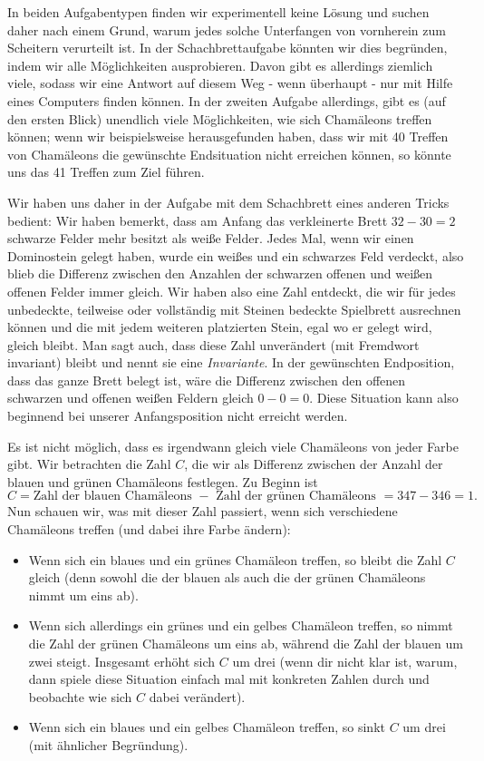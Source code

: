 \documentclass[a4paper,ngerman,12pt]{scrartcl}
\theoremstyle{definition}
\theoremstyle{plain}
\theoremstyle{remark}
\begin{document}
In beiden Aufgabentypen finden wir experimentell keine Lösung und suchen daher nach einem Grund, warum jedes solche Unterfangen von vornherein zum Scheitern verurteilt ist. In der Schachbrettaufgabe könnten wir dies begründen, indem wir alle Möglichkeiten ausprobieren. Davon gibt es allerdings ziemlich viele, sodass wir eine Antwort auf diesem Weg - wenn überhaupt - nur mit Hilfe eines Computers finden können. In der zweiten Aufgabe allerdings, gibt es (auf den ersten Blick) unendlich viele Möglichkeiten, wie sich Chamäleons treffen können; wenn wir beispielsweise herausgefunden haben, dass wir mit 40 Treffen von Chamäleons die gewünschte Endsituation nicht erreichen können, so könnte uns das 41 Treffen zum Ziel führen.

Wir haben uns daher in der Aufgabe mit dem Schachbrett eines anderen Tricks bedient: Wir haben bemerkt, dass am Anfang das verkleinerte Brett $32 - 30 = 2$ schwarze Felder mehr besitzt als weiße Felder. Jedes Mal, wenn wir einen Dominostein gelegt haben, wurde ein weißes und ein schwarzes Feld verdeckt, also blieb die Differenz zwischen den Anzahlen der schwarzen offenen und weißen offenen Felder immer gleich. Wir haben also eine Zahl entdeckt, die wir für jedes unbedeckte, teilweise oder vollständig mit Steinen bedeckte Spielbrett ausrechnen können und die mit jedem weiteren platzierten Stein, egal wo er gelegt wird, gleich bleibt. Man sagt auch, dass diese Zahl unverändert (mit Fremdwort invariant) bleibt und nennt sie eine \emph{Invariante}. In der gewünschten Endposition, dass das ganze Brett belegt ist, wäre die Differenz zwischen den offenen schwarzen und offenen weißen Feldern gleich $0 - 0 = 0$. Diese Situation kann also beginnend bei unserer Anfangsposition nicht erreicht werden.

Es ist nicht möglich, dass es irgendwann gleich viele Chamäleons von jeder Farbe gibt. Wir betrachten die Zahl $C$, die wir als Differenz zwischen der Anzahl der blauen und grünen Chamäleons festlegen. Zu Beginn ist
	\[C = \text{Zahl der blauen Chamäleons } - \text{ Zahl der grünen Chamäleons } = 347 - 346 = 1.\]
Nun schauen wir, was mit dieser Zahl passiert, wenn sich verschiedene Chamäleons treffen (und dabei ihre Farbe ändern):
\begin{itemize}
	\item Wenn sich ein blaues und ein grünes Chamäleon treffen, so bleibt die Zahl $C$ gleich (denn sowohl die der blauen als auch die der grünen Chamäleons nimmt um eins ab).
	\item Wenn sich allerdings ein grünes und ein gelbes Chamäleon treffen, so nimmt die Zahl der grünen Chamäleons um eins ab, während die Zahl der blauen um zwei steigt. Insgesamt erhöht sich $C$ um drei (wenn dir nicht klar ist, warum, dann spiele diese Situation einfach mal mit konkreten Zahlen durch und beobachte wie sich $C$ dabei verändert).
	\item Wenn sich ein blaues und ein gelbes Chamäleon treffen, so sinkt $C$ um drei (mit ähnlicher Begründung).
\end{itemize}
\end{document}

